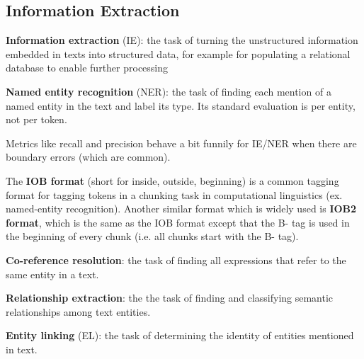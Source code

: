 \documentclass[12pt]{article}
\begin{document}
\subsection{Information Extraction}
\ulb
\item \textbf{Information extraction} (IE): the task of turning the unstructured information embedded in texts into structured data, for example for populating a relational database to enable further processing
\item \textbf{Named entity recognition} (NER): the task of finding each mention of a named entity in the text and label its type. Its standard evaluation is per entity, not per token.
\item Metrics like recall and precision behave a bit funnily for IE/NER when there are boundary errors (which are common).
\item The \textbf{IOB format} (short for inside, outside, beginning) is a common tagging format for tagging tokens in a chunking task in computational linguistics (ex. named-entity recognition). Another similar format which is widely used is \textbf{IOB2 format}, which is the same as the IOB format except that the B- tag is used in the beginning of every chunk (i.e. all chunks start with the B- tag).
\item \textbf{Co-reference resolution}: the task of finding all expressions that refer to the same entity in a text.
\item \textbf{Relationship extraction}: the the task of finding and classifying semantic relationships among text entities.
\item \textbf{Entity linking} (EL): the task of determining the identity of entities mentioned in text.
\ule
\end{document}
